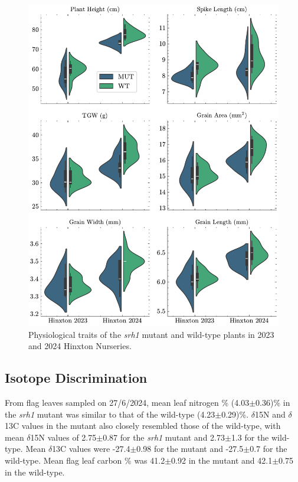 \documentclass{article}
\begin{document}
\begin{figure}[ht]
	\centering
	\includegraphics[width=\textwidth]{Hinx 23 24 Combined Plot.pdf}
	\caption{Physiological traits of the \textit{srh1} mutant and wild-type plants
		in 2023 and 2024 Hinxton Nurseries.}
	\label{Hinx_23_24_combined}
\end{figure}

\subsection{Isotope Discrimination}
From flag leaves sampled on 27/6/2024, mean leaf nitrogen \% (4.03$\pm$0.36)\%
in the \textit{srh1} mutant was similar to that of the wild-type (4.23$\pm$0.29)\%. $\delta$15N and
$\delta$13C values in the mutant also closely resembled those of the wild-type,
with mean $\delta$15N values of 2.75$\pm$0.87 for the \textit{srh1} mutant
and 2.73$\pm$1.3 for the wild-type. Mean $\delta$13C values were -27.4$\pm$0.98
for the mutant and -27.5$\pm$0.7 for the wild-type. Mean flag leaf carbon \%
was 41.2$\pm$0.92 in the mutant and 42.1$\pm$0.75 in the wild-type.
\end{document}
